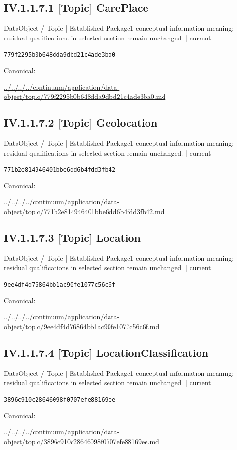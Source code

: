 \documentclass[10pt,a4paper]{article}
\begin{document}
\subsection*{IV.1.1.7.1 [Topic] CarePlace}
\label{element-779f2295b0b648dda9dbd21c4ade3ba0}
{\small DataObject / Topic | Established Package1 conceptual information meaning; residual qualifications in selected section remain unchanged. | current}\par
\texttt{779f2295b0b648dda9dbd21c4ade3ba0}\par
Canonical: \par
{\footnotesize\url{../../../../continuum/application/data-object/topic/779f2295b0b648dda9dbd21c4ade3ba0.md}}\par
\subsection*{IV.1.1.7.2 [Topic] Geolocation}
\label{element-771b2e814946401bbe6dd6b4fdd3fb42}
{\small DataObject / Topic | Established Package1 conceptual information meaning; residual qualifications in selected section remain unchanged. | current}\par
\texttt{771b2e814946401bbe6dd6b4fdd3fb42}\par
Canonical: \par
{\footnotesize\url{../../../../continuum/application/data-object/topic/771b2e814946401bbe6dd6b4fdd3fb42.md}}\par
\subsection*{IV.1.1.7.3 [Topic] Location}
\label{element-9ee4df4d76864bb1ac90fe1077c56c6f}
{\small DataObject / Topic | Established Package1 conceptual information meaning; residual qualifications in selected section remain unchanged. | current}\par
\texttt{9ee4df4d76864bb1ac90fe1077c56c6f}\par
Canonical: \par
{\footnotesize\url{../../../../continuum/application/data-object/topic/9ee4df4d76864bb1ac90fe1077c56c6f.md}}\par
\subsection*{IV.1.1.7.4 [Topic] LocationClassification}
\label{element-3896c910c28646098f0707efe88169ee}
{\small DataObject / Topic | Established Package1 conceptual information meaning; residual qualifications in selected section remain unchanged. | current}\par
\texttt{3896c910c28646098f0707efe88169ee}\par
Canonical: \par
{\footnotesize\url{../../../../continuum/application/data-object/topic/3896c910c28646098f0707efe88169ee.md}}\par
\end{document}
